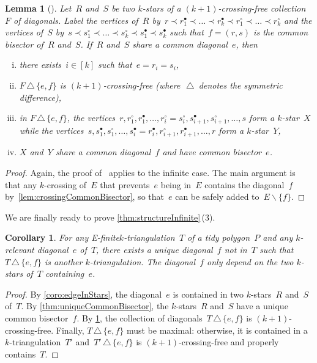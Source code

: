 \documentclass{amsart}
\newtheorem{lemma}[theorem]{Lemma}
\newtheorem{corollary}[theorem]{Corollary}
\theoremstyle{remark}
\newcommand{\ssm}{\smallsetminus} %
\newcommand{\symdif}{\,\triangle\,} %
\newcommand*{\ef}[0]{E-finite\xspace}
\newcommand*{\ktg}[0]{$k$-triangulation\xspace}
\newcommand{\cl}{\prec}
\begin{document}
\begin{lemma}[{\cite[Lem.~3.8]{PilaudSantos-multitriangulations}}]
\label{lem:flip}
Let~$R$ and~$S$ be two $k$-stars of a $(k+1)$-crossing-free collection~$F$ of diagonals.
Label the vertices of~$R$ by~$r \cl r^\bullet_1 \cl \dots \cl r^\bullet_k \cl r^\circ_1 \cl \dots \cl r^\circ_k$ and the vertices of~$S$ by~$s \cl s^\circ_1 \cl \dots \cl s^\circ_k \cl s^\bullet_1 \cl s^\bullet_k$ such that~$f = (r,s)$ is the common bisector of~$R$ and~$S$.
If~$R$ and~$S$ share a common diagonal~$e$, then
\begin{enumerate}[(i)]
\item there exists~$i \in [k]$ such that~$e = r_i = s_i$,
\item $F \symdif \{e,f\}$ is $(k+1)$-crossing-free (where~$\symdif$ denotes the symmetric difference),
\item in $F \symdif \{e,f\}$, the vertices~$r, r^\circ_1, r^\bullet_1, \dots, r^\circ_i = s^\circ_i, s^\bullet_{i+1}, s^\circ_{i+1}, \dots, s$ form a $k$-star~$X$ while the vertices~$s, s^\bullet_1, s^\circ_1, \dots, s^\bullet_i = r^\bullet_i, r^\circ_{i+1}, r^\bullet_{i+1}, \dots, r$ form a $k$-star~$Y$,
\item $X$ and~$Y$ share a common diagonal~$f$ and have common bisector~$e$.
\end{enumerate}
\end{lemma}

\begin{proof}
Again, the proof of~\cite[Lem.~3.8]{PilaudSantos-multitriangulations} applies to the infinite case.
The main argument is that any $k$-crossing of~$E$ that prevents~$e$ being in~$E$ contains the diagonal~$f$ by~\cref{lem:crossingCommonBisector}, so that~$e$ can be safely added to~$E \ssm \{f\}$.
\end{proof}

We are finally ready to prove \cref{thm:structureInfinite}\,(3).

\begin{corollary}
For any \ef \ktg~$T$ of a tidy polygon~$P$ and any $k$-relevant diagonal~$e$ of~$T$, there exists a unique diagonal~$f$ not in~$T$ such that~$T \symdif \{e,f\}$ is another $k$-triangulation. The diagonal~$f$ only depend on the two $k$-stars of~$T$ containing~$e$.
\end{corollary}

\begin{proof}
By \cref{coro:edgeInStars}, the diagonal~$e$ is contained in two $k$-stars~$R$ and~$S$ of~$T$.
By \cref{thm:uniqueCommonBisector}, the $k$-stars~$R$ and~$S$ have a unique common bisector~$f$.
By \cref{lem:flip}, the collection of diagonals~$T \symdif \{e,f\}$ is $(k+1)$-crossing-free.
Finally, $T \symdif \{e,f\}$ must be maximal: otherwise, it is contained in a $k$-triangulation~$T'$ and~$T' \symdif \{e,f\}$ is $(k+1)$-crossing-free and properly contains~$T$.
\end{proof}
\end{document}
